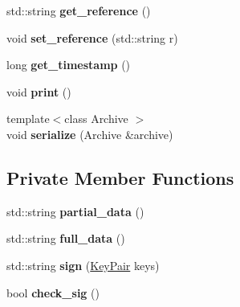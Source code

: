 \begin{DoxyCompactItemize}
\item 
std\+::string {\bfseries get\+\_\+reference} ()\hypertarget{classBlock_ac872e6b9fa7a02f76ba57bc6055047b7}{}\label{classBlock_ac872e6b9fa7a02f76ba57bc6055047b7}

\item 
void {\bfseries set\+\_\+reference} (std\+::string r)\hypertarget{classBlock_a267e493da1b311a267a2b38ee11ab923}{}\label{classBlock_a267e493da1b311a267a2b38ee11ab923}

\item 
long {\bfseries get\+\_\+timestamp} ()\hypertarget{classBlock_aada3c79ed561d5c4f564946d4aa84bb3}{}\label{classBlock_aada3c79ed561d5c4f564946d4aa84bb3}

\item 
void {\bfseries print} ()\hypertarget{classBlock_a7ea913786e48c140a2a35ff03c35746c}{}\label{classBlock_a7ea913786e48c140a2a35ff03c35746c}

\item 
{\footnotesize template$<$class Archive $>$ }\\void {\bfseries serialize} (Archive \&archive)\hypertarget{classBlock_a4024739a93a0e65932d643a5ecc5ed58}{}\label{classBlock_a4024739a93a0e65932d643a5ecc5ed58}

\end{DoxyCompactItemize}
\subsection*{Private Member Functions}
\begin{DoxyCompactItemize}
\item 
std\+::string {\bfseries partial\+\_\+data} ()\hypertarget{classBlock_af66ad56691dbc536bd301e9b63eacb53}{}\label{classBlock_af66ad56691dbc536bd301e9b63eacb53}

\item 
std\+::string {\bfseries full\+\_\+data} ()\hypertarget{classBlock_aa2151cde5904b86ee8a5dd2f438d8578}{}\label{classBlock_aa2151cde5904b86ee8a5dd2f438d8578}

\item 
std\+::string {\bfseries sign} (\hyperlink{classKeyPair}{Key\+Pair} keys)\hypertarget{classBlock_a758e2a3f91f2440d3d0e1744ba94add3}{}\label{classBlock_a758e2a3f91f2440d3d0e1744ba94add3}

\item 
bool {\bfseries check\+\_\+sig} ()\hypertarget{classBlock_a8304e1241664e2c937053b1b67844ec4}{}\label{classBlock_a8304e1241664e2c937053b1b67844ec4}

\end{DoxyCompactItemize}
